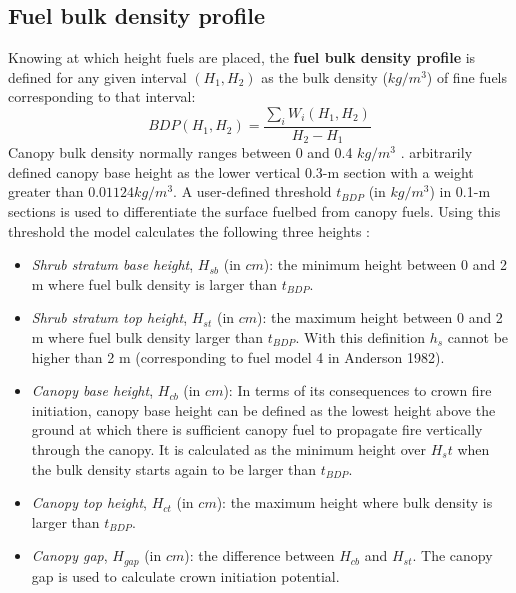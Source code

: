\documentclass[]{book}
\providecommand{\tightlist}{%
  \setlength{\itemsep}{0pt}\setlength{\parskip}{0pt}}
\begin{document}
\hypertarget{fuel-bulk-density-profile}{%
\subsection{Fuel bulk density profile}\label{fuel-bulk-density-profile}}

Knowing at which height fuels are placed, the \textbf{fuel bulk density profile} \citep{Reinhardt2006} is defined for any given interval \((H_1, H_2)\) as the bulk density (\(kg/m^3\)) of fine fuels corresponding to that interval:
\begin{equation}
BDP(H_1, H_2) = \frac{\sum_{i} W_i(H_1, H_2)}{H_2-H_1}
\end{equation}
Canopy bulk density normally ranges between 0 and 0.4 \(kg/m^3\) \citep{Scott2002}. \citet{Sando1972} arbitrarily defined canopy base height as the lower vertical 0.3-m section with a weight greater than \(0.01124 kg/m^3\). A user-defined threshold \(t_{BDP}\) (in \(kg/m^3\)) in 0.1-m sections is used to differentiate the surface fuelbed from canopy fuels. Using this threshold the model calculates the following three heights \citep{Reinhardt2006}:

\begin{itemize}
\tightlist
\item
  \emph{Shrub stratum base height}, \(H_{sb}\) (in \(cm\)): the minimum height between 0 and 2 m where fuel bulk density is larger than \(t_{BDP}\).
\item
  \emph{Shrub stratum top height}, \(H_{st}\) (in \(cm\)): the maximum height between 0 and 2 m where fuel bulk density larger than \(t_{BDP}\). With this definition \(h_{s}\) cannot be higher than 2 m (corresponding to fuel model 4 in Anderson 1982).
\item
  \emph{Canopy base height}, \(H_{cb}\) (in \(cm\)): In terms of its consequences to crown fire initiation, canopy base height can be defined as the lowest height above the ground at which there is sufficient canopy fuel to propagate fire vertically through the canopy. It is calculated as the minimum height over \(H_st\) when the bulk density starts again to be larger than \(t_{BDP}\).
\item
  \emph{Canopy top height}, \(H_{ct}\) (in \(cm\)): the maximum height where bulk density is larger than \(t_{BDP}\).
\item
  \emph{Canopy gap}, \(H_{gap}\) (in \(cm\)): the difference between \(H_{cb}\) and \(H_{st}\). The canopy gap is used to calculate crown initiation potential.
\end{itemize}
\end{document}
